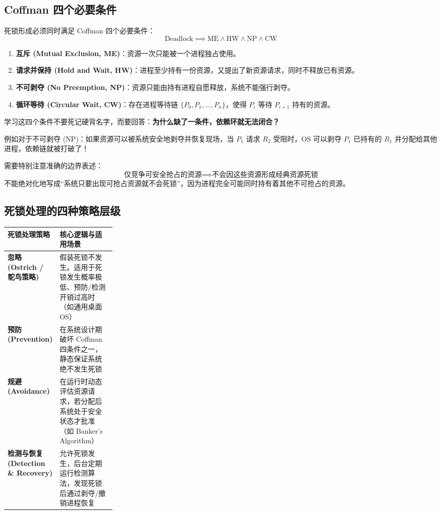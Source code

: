 \documentclass[11pt,a4paper]{ctexart}
\newcommand{\kw}[1]{\textbf{#1}}
\begin{document}
\subsection{Coffman 四个必要条件}

死锁形成必须同时满足 Coffman 四个必要条件：
\[
\boxed{\text{Deadlock} \implies \text{ME} \land \text{HW} \land \text{NP} \land \text{CW}}
\]

\begin{enumerate}
\item \kw{互斥 (Mutual Exclusion, ME)}：资源一次只能被一个进程独占使用。
\item \kw{请求并保持 (Hold and Wait, HW)}：进程至少持有一份资源，又提出了新资源请求，同时不释放已有资源。
\item \kw{不可剥夺 (No Preemption, NP)}：资源只能由持有进程自愿释放，系统不能强行剥夺。
\item \kw{循环等待 (Circular Wait, CW)}：存在进程等待链 $\{P_0, P_1, \dots, P_n\}$，使得 $P_i$ 等待 $P_{i+1}$ 持有的资源。
\end{enumerate}

学习这四个条件不要死记硬背名字，而要回答：\kw{为什么缺了一条件，依赖环就无法闭合？}

例如对于不可剥夺 (NP)：如果资源可以被系统安全地剥夺并恢复现场，当 $P_1$ 请求 $R_2$ 受阻时，OS 可以剥夺 $P_1$ 已持有的 $R_1$ 并分配给其他进程，依赖链就被打破了！

需要特别注意准确的边界表述：
\[
\boxed{\text{仅竞争可安全抢占的资源} \implies \text{不会因这些资源形成经典资源死锁}}
\]
不能绝对化地写成“系统只要出现可抢占资源就不会死锁”，因为进程完全可能同时持有着其他不可抢占的资源。

\subsection{死锁处理的四种策略层级}

\begingroup
\small
\renewcommand{\arraystretch}{1.25}
\setlength{\tabcolsep}{6pt}
\begin{tabularx}{\linewidth}{>{\bfseries}p{0.25\linewidth} X}
\toprule
死锁处理策略 & 核心逻辑与适用场景\\
\midrule
忽略 (Ostrich / 鸵鸟策略) & 假装死锁不发生。适用于死锁发生概率极低、预防/检测开销过高时（如通用桌面 OS）\\
预防 (Prevention) & 在系统设计期破坏 Coffman 四条件之一，静态保证系统绝不发生死锁\\
规避 (Avoidance) & 在运行时动态评估资源请求，若分配后系统处于安全状态才批准（如 Banker's Algorithm）\\
检测与恢复 (Detection \& Recovery) & 允许死锁发生，后台定期运行检测算法，发现死锁后通过剥夺/撤销进程恢复\\
\bottomrule
\end{tabularx}
\endgroup
\end{document}
